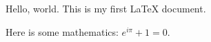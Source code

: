 \documentclass{article}
\begin{document}
Hello, world. This is my first \LaTeX{} document.

Here is some mathematics: $e^{i\pi} + 1 = 0$.
\end{document}
